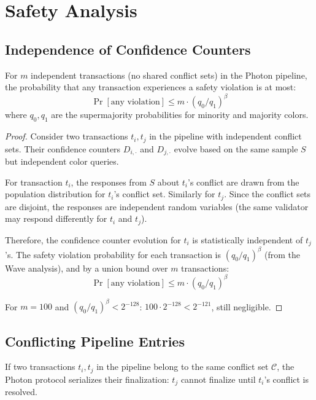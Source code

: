 \section{Safety Analysis}

\label{sec:photon-safety}

\subsection{Independence of Confidence Counters}

\begin{theorem}
\label{thm:photon-pipeline-safety}
For $m$ independent transactions (no shared conflict sets) in the Photon pipeline, the
probability that any transaction experiences a safety violation is at most:
\[
\Pr[\text{any violation}] \leq m \cdot (q_0/q_1)^\beta
\]
where $q_0, q_1$ are the supermajority probabilities for minority and majority colors.
\end{theorem}

\begin{proof}
Consider two transactions $t_i, t_j$ in the pipeline with independent conflict sets.
Their confidence counters $D_{i,\cdot}$ and $D_{j,\cdot}$ evolve based on the same
sample $S$ but independent color queries.

For transaction $t_i$, the responses from $S$ about $t_i$'s conflict are drawn from
the population distribution for $t_i$'s conflict set. Similarly for $t_j$. Since the
conflict sets are disjoint, the responses are independent random variables (the same
validator may respond differently for $t_i$ and $t_j$).

Therefore, the confidence counter evolution for $t_i$ is statistically independent of
$t_j$'s. The safety violation probability for each transaction is $(q_0/q_1)^\beta$
(from the Wave analysis), and by a union bound over $m$ transactions:
\[
\Pr[\text{any violation}] \leq m \cdot (q_0/q_1)^\beta
\]

For $m = 100$ and $(q_0/q_1)^\beta < 2^{-128}$: $100 \cdot 2^{-128} < 2^{-121}$,
still negligible.
\end{proof}

\subsection{Conflicting Pipeline Entries}

\begin{lemma}
\label{lem:photon-serialization}
If two transactions $t_i, t_j$ in the pipeline belong to the same conflict set
$\mathcal{C}$, the Photon protocol serializes their finalization: $t_j$ cannot finalize
until $t_i$'s conflict is resolved.
\end{lemma}

